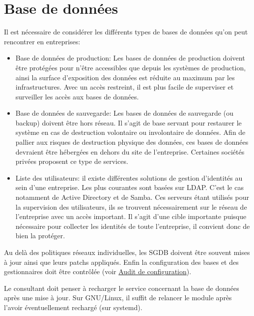 \documentclass[twoside,a4paper,12pt,titlepage]{book}
\begin{document}
\section{Base de données\label{ArchiDatabase}}
Il est nécessaire de considérer les différents types de bases de données qu'on peut rencontrer en entreprises:\begin{itemize}
	\item Base de données de production: Les bases de données de production doivent être protégées pour n'être accessibles que depuis les systèmes de production, ainsi la surface d'exposition des données est réduite au maximum par les infrastructures. Avec un accès restreint, il est plus facile de superviser et surveiller les accès aux bases de données.
	\item Base de données de sauvegarde: Les bases de données de sauvegarde (ou backup) doivent être hors réseau. Il s'agit de base servant pour restaurer le système en cas de destruction volontaire ou involontaire de données. Afin de pallier aux risques de destruction physique des données, ces bases de données devraient être hébergées en dehors du site de l'entreprise. Certaines sociétés privées proposent ce type de services.
	\item Liste des utilisateurs: il existe différentes solutions de gestion d'identités au sein d'une entreprise. Les plus courantes sont basées sur LDAP. C'est le cas notamment de Active Directory et de Samba. Ces serveurs étant utilisés pour la supervision des utilisateurs, ils se trouvent nécessairement sur le réseau de l'entreprise avec un accès important. Il s'agit d'une cible importante puisque nécessaire pour collecter les identités de toute l'entreprise, il convient donc de bien la protéger.
\end{itemize}
Au delà des politiques réseaux individuelles, les \gls{SGDB} doivent être souvent mises à jour ainsi que leurs patchs appliqués. Enfin la configuration des bases et des gestionnaires doit être contrôlée (voir \hyperref[AuditConf]{Audit de configuration}).
\begin{Warning}
	Le consultant doit penser à recharger le service concernant la base de données après une mise à jour. Sur GNU/Linux, il suffit de relancer le module après l'avoir éventuellement rechargé (sur systemd).
\end{Warning}
\end{document}
